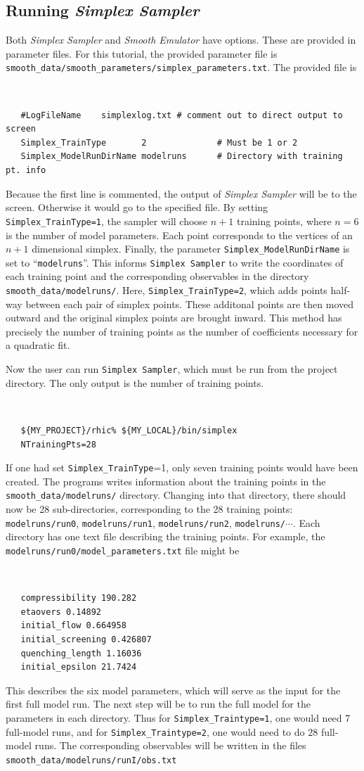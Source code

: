 \documentclass[UserManual.tex]{subfiles}
\begin{document}
\subsection{Running {\it Simplex Sampler}}

Both {\it Simplex Sampler} and {\it Smooth Emulator} have options. These are provided in parameter files. For this tutorial, the provided parameter file is {\tt smooth\_data/smooth\_parameters/simplex\_parameters.txt}. The provided file is
{\tt
\begin{verbatim}
   #LogFileName    simplexlog.txt # comment out to direct output to screen
   Simplex_TrainType       2              # Must be 1 or 2             
   Simplex_ModelRunDirName modelruns      # Directory with training pt. info
\end{verbatim}
}
Because the first line is commented, the output of {\it Simplex Sampler} will be to the screen. Otherwise it would go to the specified file. By setting {\tt Simplex\_TrainType=1}, the sampler will choose $n+1$ training points, where $n=6$ is the number of model parameters. Each point corresponds to the vertices of an $n+1$ dimensional simplex.  Finally, the parameter {\tt Simplex\_ModelRunDirName} is set to ``{\tt modelruns}''. This informs {\tt Simplex Sampler} to write the coordinates of each training point and the corresponding observables in the directory {\tt smooth\_data/modelruns/}. Here, {\tt Simplex\_TrainType=2}, which adds points half-way between each pair of simplex points. These additonal points are then moved outward and the original simplex points are brought inward. This method has precisely the number of training points as the number of coefficients necessary for a quadratic fit. 

Now the user can run {\tt Simplex Sampler}, which must be run from the project directory. The only output is the number of training points.
 {\tt
\begin{verbatim}
   ${MY_PROJECT}/rhic% ${MY_LOCAL}/bin/simplex
   NTrainingPts=28
\end{verbatim}
}
If one had set {\tt Simplex\_TrainType}=1, only seven training points would have been created. The programs writes information about the training points in the {\tt smooth\_data/modelruns/} directory. Changing into that directory, there should now be 28 sub-directories, corresponding to the 28 training points: {\tt modelruns/run0}, {\tt modelruns/run1}, {\tt modelruns/run2}, {\tt modelruns/}$\cdots$. Each directory has one text file describing the training points. For example, the {\tt modelruns/run0/model\_parameters.txt} file might be 
{\tt
\begin{verbatim}
   compressibility 190.282
   etaovers 0.14892
   initial_flow 0.664958
   initial_screening 0.426807
   quenching_length 1.16036
   initial_epsilon 21.7424
\end{verbatim}
}
This describes the six model parameters, which will serve as the input for the first full model run.  The next step will be to run the full model for the parameters in each directory. Thus for {\tt Simplex\_Traintype=1}, one would need 7 full-model runs, and for {\tt Simplex\_Traintype=2}, one would need to do 28 full-model runs. The corresponding observables will be written in the files {\tt smooth\_data/modelruns/runI/obs.txt}
\end{document}
